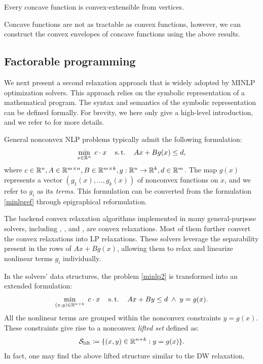\begin{lemma}
\label{thm.poly}
    Every concave function is convex-extensible from vertices.
\end{lemma}
Concave functions are not as tractable as convex functions, however, we can construct the convex envelopes of concave functions using the above results.


\subsection{Factorable programming}

We next present a second relaxation  approach that is widely adopted by MINLP optimization solvers. This approach relies on the symbolic representation of a mathematical program. The syntax and semantics of the symbolic representation can be defined formally. For brevity, we here only give a high-level introduction, and we refer to \cite{leoinbook,leonelson} for more details.


General nonconvex NLP problems typically admit the following  formulation:
 \begin{equation}
\label{minlp2}
	\min_{x \in \mathbb R^n} \;  c\cdot x  \quad \operatorname{s.t.} \quad  Ax +  B g(x)\le d,
\end{equation}
where $c \in \mathbb R^n, A \in \mathbb R^{m \times n},  B \in \mathbb R^{m \times k}, g: \mathbb R^n \to \mathbb R^k,  d \in \mathbb R^m$. The map $g(x)$ represents a vector $(g_1(x),\dots,g_k(x))$ of nonconvex functions on $x$, and we refer to $g_i$  as its \emph{terms}. This formulation can be converted from the formulation \eqref{minlpref} through epigraphical reformulation.


The backend convex relaxation algorithms implemented in many general-purpose  solvers, including \baron, \couenne,  and \scip, are convex relaxations. Most of them further convert the convex relaxations into LP relaxations. These solvers leverage the separability present in the rows of $Ax+Bg(x)$, allowing them to relax and linearize  nonlinear terms $g_i$ individually. 



In the solvers' data structures, the problem \eqref{minlp2} is transformed into an extended formulation:
 \begin{equation}
 \label{minlp3}
	\min_{ (x,y) \in \mathbb R^{n+k}} \;  c\cdot x  \quad \operatorname{s.t.} \quad  Ax +  B y\le d \; \land \; y = g(x).
\end{equation}
All the nonlinear terms are grouped within the nonconvex constraints $y = g(x)$. These constraints give rise to a nonconvex \emph{lifted set} defined as:
\begin{equation}
\label{eq.lift}
 \mathcal S_{\mathrm{lift}} \coloneqq \{(x,y) \in \mathbb R^{n+k}: y = g(x)\}.	 
\end{equation} 
In fact, one may find the above lifted structure similar to the DW relaxation. 
 
